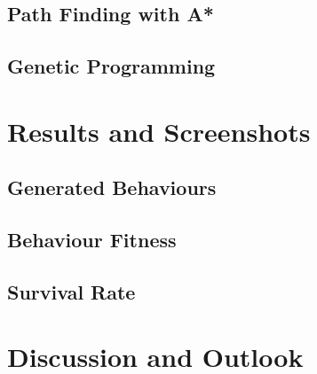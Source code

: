 \documentclass[a4paper, twocolumn]{article}
\begin{document}
        \subsection{Path Finding with A*} \label{sec:path_finding_implementation}



        \subsection{Genetic Programming} \label{sec:genetic_programming_implementation}



    \section{Results and Screenshots} \label{sec:results_and_screenshots}



        \subsection{Generated Behaviours} \label{sec:generated_behaviours}



        \subsection{Behaviour Fitness} \label{sec:behaviour_fitness}



        \subsection{Survival Rate} \label{sec:survival_rate}



    \section{Discussion and Outlook} \label{sec:discussion_and_outlook}
\end{document}

